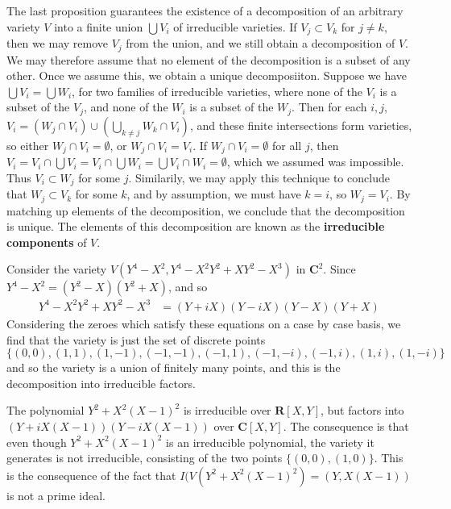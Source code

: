 The last proposition guarantees the existence of a decomposition of an arbitrary variety $V$ into a finite union $\bigcup V_i$ of irreducible varieties. If $V_j \subset V_k$ for $j \neq k$, then we may remove $V_j$ from the union, and we still obtain a decomposition of $V$. We may therefore assume that no element of the decomposition is a subset of any other. Once we assume this, we obtain a unique decomposiiton. Suppose we have $\bigcup V_i = \bigcup W_i$, for two families of irreducible varieties, where none of the $V_i$ is a subset of the $V_j$, and none of the $W_i$ is a subset of the $W_j$. Then for each $i,j$, $V_i = (W_j \cap V_i) \cup (\bigcup_{k \neq j} W_k \cap V_i)$, and these finite intersections form varieties, so either $W_j \cap V_i = \emptyset$, or $W_j \cap V_i = V_i$. If $W_j \cap V_i = \emptyset$ for all $j$, then $V_i = V_i \cap \bigcup V_i = V_i \cap \bigcup W_i = \bigcup V_i \cap W_i = \emptyset$, which we assumed was impossible. Thus $V_i \subset W_j$ for some $j$. Similarily, we may apply this technique to conclude that $W_j \subset V_k$ for some $k$, and by assumption, we must have $k = i$, so $W_j = V_i$. By matching up elements of the decomposition, we conclude that the decomposition is unique. The elements of this decomposition are known as the {\bf irreducible components} of $V$.

\begin{example}
    Consider the variety $V(Y^4 - X^2, Y^4 - X^2Y^2 + XY^2 - X^3)$ in $\mathbf{C}^2$. Since $Y^4 - X^2 = (Y^2 - X)(Y^2 + X)$, and so
    \begin{align*}
        Y^4 - X^2Y^2 + XY^2 - X^3 &= (Y + iX)(Y - iX)(Y-X)(Y+X)
    \end{align*}
    Considering the zeroes which satisfy these equations on a case by case basis, we find that the variety is just the set of discrete points
    \[ \{ (0,0), (1,1), (1,-1), (-1,-1), (-1,1), (-1,-i), (-1,i), (1,i), (1,-i) \} \]
    and so the variety is a union of finitely many points, and this is the decomposition into irreducible factors.
\end{example}

\begin{example}
    The polynomial $Y^2 + X^2(X-1)^2$ is irreducible over $\mathbf{R}[X,Y]$, but factors into $(Y + iX(X-1))(Y - iX(X-1))$ over $\mathbf{C}[X,Y]$. The consequence is that even though $Y^2 + X^2(X-1)^2$ is an irreducible polynomial, the variety it generates is not irreducible, consisting of the two points $\{ (0,0), (1,0) \}$. This is the consequence of the fact that $I(V(Y^2 + X^2(X-1)^2) = (Y,X(X-1))$ is not a prime ideal.
\end{example}

